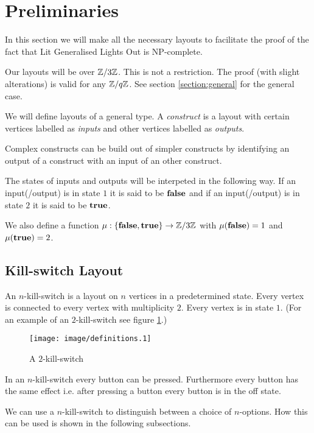 \section{Preliminaries}\label{section:preliminaries}

In this section we will make all the necessary layouts to facilitate the
proof of the fact that Lit Generalised Lights Out is NP-complete.

Our layouts will be over $\mathbb{Z}/3\mathbb{Z}$. This is not a restriction. The proof
(with slight alterations) is valid for any $\mathbb{Z}/q\mathbb{Z}$. See section
\ref{section:general} for the general case.

We will define layouts of a general type. A \emph{construct} is a layout
with certain vertices labelled as \emph{inputs} and other vertices
labelled as \emph{outputs}.

Complex constructs can be build out of simpler constructs by
identifying an output of a construct with an input of an other
construct.

The states of inputs and outputs will be interpeted in the following
way. If an input(/output) is in state $1$ it is said to be ${\text{\bf false}}$ and if
an input(/output) is in state $2$ it is said to be $\text{\bf true}$.

We also define a function $\mu : \{{\text{\bf false}},\text{\bf true}\} \rightarrow \mathbb{Z}/3\mathbb{Z}$ with
$\mu({\text{\bf false}}) = 1$ and $\mu(\text{\bf true}) = 2$.

\subsection{Kill-switch Layout}

An  $n$-kill-switch is a layout on $n$ vertices in a predetermined
state. Every vertex is connected to every vertex with multiplicity $2$.
Every vertex is in state $1$. (For an example of an $2$-kill-switch see
figure \ref{figure:killswitch}.) 
\begin{figure}
	\begin{center}
		\texttt{[image: image/definitions.1]}
	\end{center}
	\caption{A $2$-kill-switch}\label{figure:killswitch}
\end{figure}

In an $n$-kill-switch every button can be pressed. Furthermore every
button has the same effect i.e. after pressing a button every button is
in the off state.
 
We can use a $n$-kill-switch to distinguish between a choice of
$n$-options. How this can be used is shown in the following subsections.

